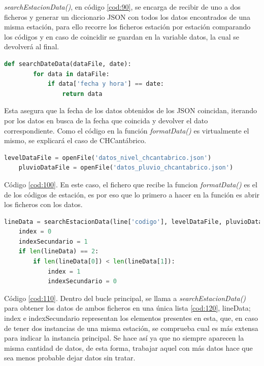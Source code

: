 \textit{searchEstacionData()}, en código \ref{cod:90}, se encarga de recibir de uno a dos ficheros y generar un diccionario JSON con todos los datos encontrados de una misma estación, para ello recorre los ficheros estación por estación comparando los códigos y en caso de coincidir se guardan en la variable datos, la cual se devolverá al final.

\begin{lstlisting}[language=Python, caption={Declaración función \textit{searchDateData()}}]
	def searchDateData(dataFile, date):
		for data in dataFile:
			if data['fecha y hora'] == date:
				return data
\end{lstlisting}

Esta asegura que la fecha de los datos obtenidos de los JSON coincidan, iterando por los datos en busca de la fecha que coincida y devolver el dato correspondiente. \newline
\newline
Como el código en la función \textit{formatData()} es virtualmente el mismo, se explicará el caso de CHCantábrico.

\begin{lstlisting}[language=Python, caption={Lectura de los ficheros de datos de CHCantábrico}, label=cod:100]
	levelDataFile = openFile('datos_nivel_chcantabrico.json')
	pluvioDataFile = openFile('datos_pluvio_chcantabrico.json')
\end{lstlisting}

Código \ref{cod:100}. En este caso, el fichero que recibe la funcion \textit{formatData()} es el de los códigos de estación, es por eso que lo primero a hacer en la función es abrir los ficheros con los datos.

\begin{lstlisting}[language=Python, caption={Dentro del bucle que itera por estaciones, obtención de los datos de la estacion y declaración de indices}, label=cod:110]
	lineData = searchEstacionData(line['codigo'], levelDataFile, pluvioDataFile)
	index = 0
	indexSecundario = 1
	if len(lineData) == 2:
		if len(lineData[0]) < len(lineData[1]):
			index = 1
			indexSecundario = 0
\end{lstlisting}

Código \ref{cod:110}. Dentro del bucle principal, se llama a \textit{searchEstacionData()} para obtener los datos de ambos ficheros en una única lista \ref{cod:120}, lineData; index e indexSecundario representan los elementos presentes en esta, que, en caso de tener dos instancias de una misma estación, se comprueba cual es más extensa para indicar la instancia principal. Se hace así ya que no siempre aparecen la misma cantidad de datos, de esta forma, trabajar aquel con más datos hace que sea menos probable dejar datos sin tratar.

